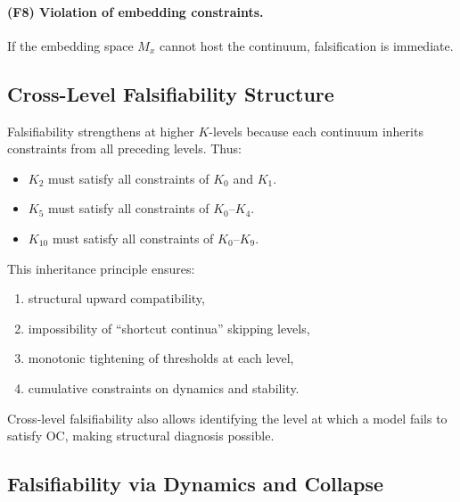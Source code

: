 \paragraph{(F8) Violation of embedding constraints.}
If the embedding space $M_x$ cannot host the continuum, falsification
is immediate.



\subsection{Cross-Level Falsifiability Structure}

Falsifiability strengthens at higher $K$-levels because each continuum
inherits constraints from all preceding levels.
Thus:

\begin{itemize}
    \item $K_2$ must satisfy all constraints of $K_0$ and $K_1$.
    \item $K_5$ must satisfy all constraints of $K_0$–$K_4$.
    \item $K_{10}$ must satisfy all constraints of $K_0$–$K_9$.
\end{itemize}

This inheritance principle ensures:

\begin{enumerate}
    \item structural upward compatibility,
    \item impossibility of “shortcut continua” skipping levels,
    \item monotonic tightening of thresholds at each level,
    \item cumulative constraints on dynamics and stability.
\end{enumerate}

Cross-level falsifiability also allows identifying the level at which a
model fails to satisfy OC, making structural diagnosis possible.



\subsection{Falsifiability via Dynamics and Collapse}

